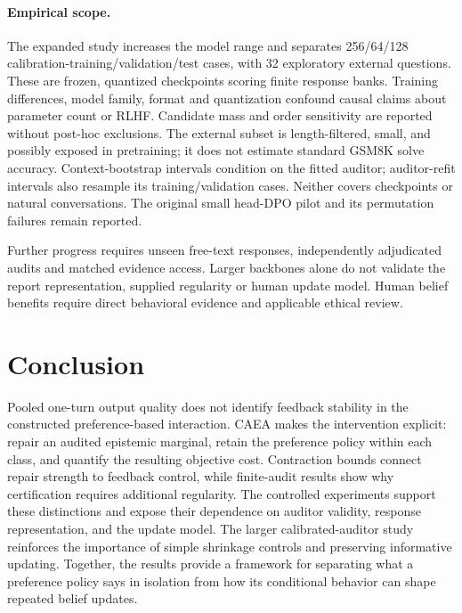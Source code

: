 \documentclass[10pt]{article}
\begin{document}
\paragraph{Empirical scope.}
The expanded study increases the model range and separates 256/64/128
calibration-training/validation/test cases, with 32 exploratory external
questions. These are frozen, quantized checkpoints scoring finite response
banks. Training differences, model family, format and quantization confound
causal claims about parameter count or RLHF. Candidate mass and order
sensitivity are reported without post-hoc exclusions. The external subset
is length-filtered, small, and possibly exposed in pretraining; it does not
estimate standard GSM8K solve accuracy. Context-bootstrap intervals
condition on the fitted auditor; auditor-refit intervals also resample its
training/validation cases. Neither covers checkpoints or natural conversations.
The original small head-DPO pilot and its permutation failures remain reported.

Further progress requires unseen free-text responses, independently
adjudicated audits and matched evidence access. Larger backbones alone do
not validate the report representation, supplied regularity or human update
model. Human belief benefits require direct behavioral evidence and
applicable ethical review.

\section{Conclusion}
Pooled one-turn output quality does not identify feedback stability in the
constructed preference-based interaction. CAEA makes the intervention
explicit: repair an audited epistemic marginal, retain the preference
policy within each class, and quantify the resulting objective cost.
Contraction bounds connect repair strength to feedback control, while
finite-audit results show why certification requires additional regularity.
The controlled experiments support these distinctions and expose their
dependence on auditor validity, response representation, and the update
model. The larger calibrated-auditor study reinforces the importance of
simple shrinkage controls and preserving informative updating. Together, the results provide a framework for separating what a
preference policy says in isolation from how its conditional behavior can
shape repeated belief updates.
\end{document}
